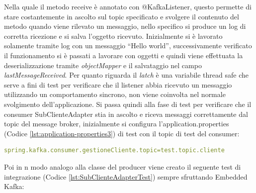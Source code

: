 Nella quale il metodo receive è annotato con @KafkaListener, questo permette di stare costantemente in ascolto sul topic specificato e svolgere il contenuto del metodo quando viene rilevato un messaggio, nello specifico si produce un log di corretta ricezione e si salva l’oggetto ricevuto. Inizialmente si è lavorato solamente tramite log con un messaggio “Hello world”, successivamente verificato il funzionamento si è passati a lavorare con oggetti e quindi viene effettuata la deserializzazione tramite \textit{objectMapper} e il salvataggio nel campo \textit{lastMessageReceived}. Per quanto riguarda il \textit{latch} è una variabile thread safe che serve a fini di test per verificare che il listener abbia ricevuto un messaggio utilizzando un comportamento sincrono, non viene coinvolta nel normale svolgimento dell’applicazione.
Si passa quindi alla fase di test per verificare che il consumer SubClienteAdapter stia in ascolto e riceva messaggi correttamente dal topic del message broker, inizialmente si configura l’application.properties (Codice \vref{lst:application-properties3}) di test con il topic di test del consumer:
\begin{lstlisting}[language=yaml, caption={Aggiornamento del file `application.properties` di test per il consumer Kafka}, label=lst:application-properties3]
spring.kafka.consumer.gestioneCliente.topic=test.topic.cliente
\end{lstlisting}
Poi in n modo analogo alla classe del producer viene creato il seguente test di integrazione (Codice \vref{lst:SubClienteAdapterTest}) sempre sfruttando Embedded Kafka:
